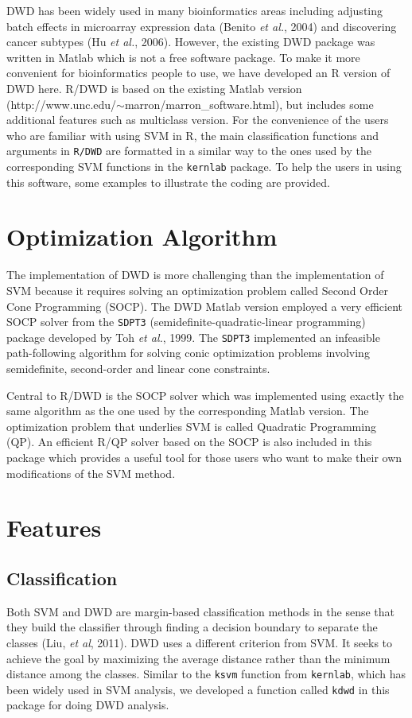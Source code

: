 \documentclass{bioinfo}
\begin{document}
DWD has been widely used in many bioinformatics areas including
adjusting batch effects in microarray expression data (Benito {\em et
  al.}, 2004) and discovering cancer subtypes (Hu {\em et al.},
2006). However, the existing DWD package was written in Matlab which
is not a free software package. To make it more convenient for
bioinformatics people to use, we have developed an R version of DWD
here. R/DWD is based on the existing Matlab version
(http://www.unc.edu/$\sim$marron/marron\_software.html), but includes
some additional features such as multiclass version. For the
convenience of the users who are familiar with using SVM in R, the
main classification functions and arguments in \texttt{R/DWD} are
formatted in a similar way to the ones used by the corresponding SVM
functions in the \texttt{kernlab} package. To help the users in using
this software, some examples to illustrate the coding are provided.

\section{Optimization Algorithm}
The implementation of DWD is more challenging than the implementation
of SVM because it requires solving an optimization problem called
Second Order Cone Programming (SOCP).  The DWD Matlab version employed
a very efficient SOCP solver from the \texttt{SDPT3}
(semidefinite-quadratic-linear programming) package developed by Toh
{\em et al.}, 1999. The \texttt{SDPT3} implemented an infeasible
path-following algorithm for solving conic optimization problems
involving semidefinite, second-order and linear cone constraints.

Central to R/DWD is the SOCP solver which was implemented using
exactly the same algorithm as the one used by the corresponding Matlab
version. The optimization problem that underlies SVM is called
Quadratic Programming (QP). An efficient R/QP solver based on the SOCP
is also included in this package which provides a useful tool for
those users who want to make their own modifications of the SVM
method.

\section{Features}

\subsection{Classification}
Both SVM and DWD are margin-based classification methods in the sense
that they build the classifier through finding a decision boundary to
separate the classes (Liu, {\em et al}, 2011). DWD uses a different
criterion from SVM. It seeks to achieve the goal by maximizing the
average distance rather than the minimum distance among the
classes. Similar to the \texttt{ksvm} function from \texttt{kernlab},
which has been widely used in SVM analysis, we developed a function
called \texttt{kdwd} in this package for doing DWD analysis.
\end{document}
